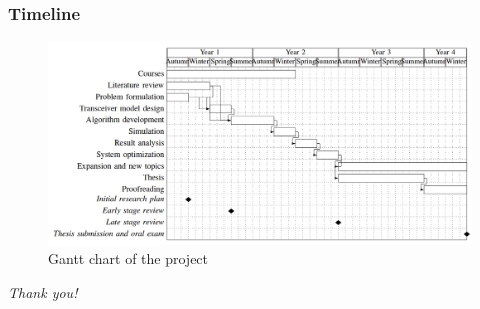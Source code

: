 \documentclass{beamer}
\begin{document}
\begin{frame}
\frametitle{Timeline}

\begin{figure}
  \centering
    \includegraphics[width=\textwidth]{gantt_chart}
  \caption{Gantt chart of the project}
  \label{fig:gantt_chart}
\end{figure}

\end{frame}


\begin{frame}
  \centering
  \Large \emph{Thank you!}
\end{frame}



\end{document}
